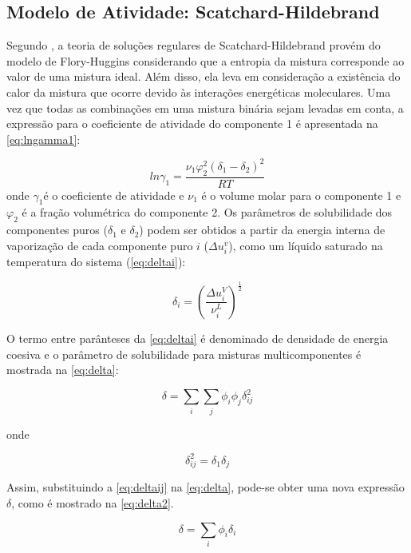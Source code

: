 \subsection{Modelo de Atividade: Scatchard-Hildebrand}
Segundo , a teoria de soluções regulares de
Scatchard-Hildebrand provém do modelo de Flory-Huggins considerando que a entropia da mistura corresponde ao valor 
de uma mistura ideal. Além disso, ela leva em consideração a existência do 
calor da mistura que ocorre devido às interações energéticas moleculares. 
Uma vez que todas as combinações em uma mistura binária sejam levadas em 
conta, a expressão para o coeficiente de atividade do componente 1 é
apresentada na \autoref{eq:lngamma1}:

\begin{equation}\label{eq:lngamma1}
ln\gamma_1 = \frac{\nu_1\varphi_2^2(\delta_1-\delta_2)^2}{RT}
\end{equation}
onde $\gamma_1$é o coeficiente de atividade e $\nu_1$ é o volume molar para o
componente 1 e $\varphi_2$ é a fração volumétrica do componente 2. Os parâmetros
de solubilidade dos componentes puros ($\delta_1$ e $\delta_2$) podem ser
obtidos a partir da energia interna de vaporização de cada componente puro $i$
($\Delta u_i^v$), como um líquido saturado na temperatura do sistema
(\autoref{eq:deltai}):

\begin{equation}\label{eq:deltai}
\delta_i = \left ( \frac{\Delta u_i^V}{\nu_i^L} \right )^{\frac{1}{2}}
\end{equation}

O termo entre parânteses da \autoref{eq:deltai} é denominado de densidade de energia
coesiva e o parâmetro de solubilidade para misturas multicomponentes é mostrada
na \autoref{eq:delta}:

\begin{equation}\label{eq:delta}
\delta = \sum_i\sum_j\phi_i\phi_j\delta_{ij}^2
\end{equation}

onde

\begin{equation}\label{eq:deltaij}
\delta_{ij}^2 = \delta_1\delta_j
\end{equation}

Assim, substituindo a \autoref{eq:deltaij} na \autoref{eq:delta}, pode-se obter
uma nova expressão $\delta$, como é mostrado na \autoref{eq:delta2}.

\begin{equation}\label{eq:delta2}
\delta = \sum_i\phi_i\delta_i
\end{equation}


